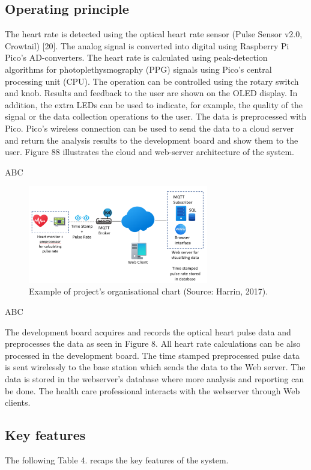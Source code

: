 \documentclass{article}
\begin{document}
\subsection{Operating principle}

The heart rate is detected using the optical heart rate sensor (Pulse Sensor v2.0, Crowtail)
[20]. The analog signal is converted into digital using Raspberry Pi Pico’s AD-converters.
The heart rate is calculated using peak-detection algorithms for photoplethysmography
(PPG) signals using Pico’s central processing unit (CPU). The operation can be controlled
using the rotary switch and knob. Results and feedback to the user are shown on the OLED
display. In addition, the extra LEDs can be used to indicate, for example, the quality of the
signal or the data collection operations to the user.
The data is preprocessed with Pico. Pico’s wireless connection can be used to send the data
to a cloud server and return the analysis results to the development board and show them to
the user. Figure 88 illustrates the cloud and web-server architecture of the system.

ABC
\begin{figure}[h]
  \centering
  \includegraphics[width=0.7\textwidth]{web_server.png}
  \caption{ Example of project's organisational chart (Source: Harrin, 2017).}
  \label{harrin}
\end{figure}

ABC

The development board acquires and records the optical heart pulse data and preprocesses
the data as seen in Figure 8. All heart rate calculations can be also processed in the
development board. The time stamped preprocessed pulse data is sent wirelessly to the
base station which sends the data to the Web server. The data is stored in the webserver’s
database where more analysis and reporting can be done. The health care professional
interacts with the webserver through Web clients.

\subsection{Key features}
The following Table 4. recaps the key features of the system.
\end{document}
